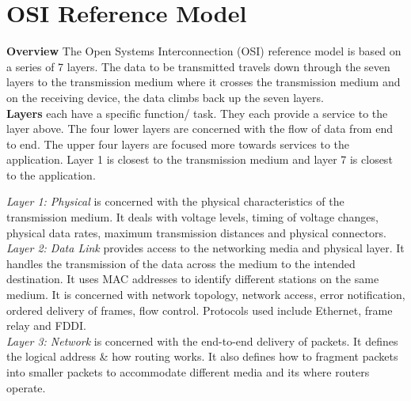 \documentclass[a4paper,11pt]{article}
\begin{document}
\section{OSI Reference Model}
\textbf{Overview} The Open Systems Interconnection (OSI) reference model is based on a series of 7 layers. The data to be transmitted travels down through the seven layers to the transmission medium where it crosses the transmission medium and on the receiving device, the data climbs back up the seven layers.\\
\textbf{Layers} each have a specific function/ task. They each provide a service to the layer above. The four lower layers are concerned with the flow of data from end to end. The upper four layers are focused more towards services to the application. Layer 1 is closest to the transmission medium and layer 7 is closest to the application.
\begin{adjustwidth}{2em}{1em} 
\textit{Layer 1: Physical} is concerned with the physical characteristics of the transmission medium. It deals with voltage levels, timing of voltage changes, physical data rates, maximum transmission distances and physical connectors.\\
\textit{Layer 2: Data Link} provides access to the networking media and physical layer. It handles the transmission of the data across the medium to the intended destination. It uses MAC addresses to identify different stations on the same medium. It is concerned with network topology, network access, error notification, ordered delivery of frames, flow control. Protocols used include Ethernet, frame relay and FDDI. \\
\textit{Layer 3: Network} is concerned with the end-to-end delivery of packets. It defines the logical address \& how routing works. It also defines how to fragment packets into smaller packets to accommodate different media and its where routers operate. 

\end{adjustwidth}
\end{document}
